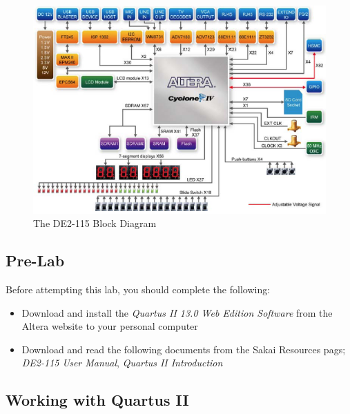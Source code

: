 \begin{figure}[H]
	\centering
	\includegraphics[width=170mm]{Lab1/figures/DE2-115Block.png}
	\caption{The DE2-115 Block Diagram}
	\label{fig:DE2Block}
\end{figure}

\subsection{Pre-Lab}

Before attempting this lab, you should complete the following:

\begin{itemize}
	\item Download and install the \emph{Quartus II 13.0 Web Edition Software} from the Altera website to your personal computer
	\item Download and read the following documents from the Sakai Resources pags;  \emph{DE2-115 User Manual}, \emph{Quartus II Introduction}
\end{itemize}
 
\subsection{Working with Quartus II}

